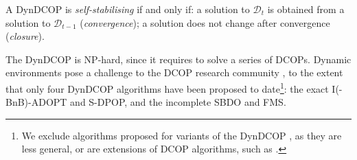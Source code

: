 \begin{definition}\label{def:self-stabilising}
    A DynDCOP is \emph{self-stabilising} if and only if: a solution to $\mathcal{D}_t$ is
    obtained from a solution to $\mathcal{D}_{t-1}$ (\emph{convergence}); a solution does
    not change after convergence (\emph{closure}).
\end{definition}

\begin{table}[t]
    \centering
    \caption[Characteristics of the DynDCOP algorithms proposed to date]{Characteristics
    of the DynDCOP algorithms proposed to date, where $T$ denotes the total number of
    time steps, and the other variables are the same as those used in Table
    \ref{t:dcop_chars}. The top side rows refer to exact algorithms, while those on
    the bottom side refer to incomplete algorithms.}
    \label{t:dyndcop_chars}
\end{table}

The DynDCOP is NP-hard, since it requires to solve a series of DCOPs. Dynamic
environments pose a challenge to the DCOP research community
\cite{barambones2021survey,fioretto2018survey,leite2014survey,lesser2014,petcu2007thesis},
to the extent that only four DynDCOP algorithms have been proposed to date\footnote{We
exclude algorithms proposed for variants of the DynDCOP \cite[Section
$4.4$]{barambones2021survey}, as they are less general, or are extensions of DCOP
algorithms, such as \cite{zivan2015}.}: the exact I(-BnB)-ADOPT and S-DPOP, and the
incomplete SBDO and FMS.

